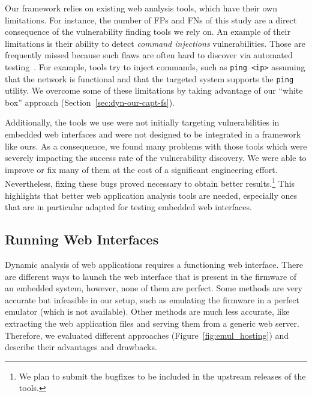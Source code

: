 \documentclass[conference]{./templates/ndss/IEEEtran}
\newcounter{t0d0_counter}
\newcounter{pr00f_counter}
\begin{document}
Our framework relies on existing web analysis tools, which have their
own limitations.  For instance, the number of FPs and FNs of this
study are a direct consequence of the vulnerability finding tools we
rely on. An example of their limitations is their ability to detect
\emph{command injections} vulnerabilities.  Those are frequently
missed because such flaws are often hard to discover via automated
testing~\cite{foot-owasp-cmdinj,elie-sp2010-AutoBlackBoxWebTest}.  For
example, tools try to inject commands, such as \texttt{ping <ip>}
assuming that the network is functional and that the targeted system
supports the \texttt{ping} utility.  We overcome some of these
limitations by taking advantage of our ``white box'' approach
(Section~\ref{sec:dyn-our-capt-fs}).

\label{sec:discuss-bugsdyntools}
Additionally, the tools we use were not initially targeting vulnerabilities in
embedded web interfaces and were not designed to be 
integrated in a framework like ours. As a consequence, we found many
problems with those tools which were severely impacting the success
rate of the vulnerability discovery.  We were able to improve or fix
many of them at the cost of a significant engineering effort.
Nevertheless, fixing these bugs proved necessary to obtain better
results.\footnote{We plan to submit the bugfixes to be included in the
  upstream releases of the tools.}  This highlights that better web
application analysis tools are needed, especially ones that are in particular adapted for
testing embedded web interfaces.









\subsection{Running Web Interfaces}
\label{sec:emulating-firmwares}


Dynamic analysis of web applications requires a functioning web
interface. There are different ways to launch the web 
interface that is present in the firmware of an embedded system, however,
none of them are perfect. Some methods are very accurate but
infeasible in our setup, such as emulating the firmware in a perfect
emulator (which is not available). Other methods are much less
accurate, like extracting the web application files and serving them
from a generic web server. Therefore, we evaluated different
approaches (Figure~\ref{fig:emul_hosting}) and describe their advantages 
and drawbacks. 
\end{document}
